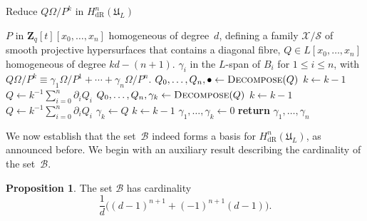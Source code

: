 \documentclass[a4paper,11pt]{article}
\numberwithin{equation}{section}
\newcommand{\ZZ}{\mathbf{Z}} %
\providecommand{\HdR}{H_{\text{dR}}}    %
\providecommand{\cB}{\mathcal{B}} %
\theoremstyle{definition}
\newtheorem{prop}[thm]{Proposition}
\begin{document}
\begin{algorithm}
\caption{Reduce $Q \Omega / P^k$ in $\HdR^n(\mathfrak{U}_L)$}
\label{alg:PoleRed}
\begin{algorithmic}
\vspace{1mm}
\Require $P$ in $\ZZ_q[t][x_0, \dotsc, x_n]$ homogeneous of degree~$d$, 
         defining a family $\mathcal{X}/\mathcal{S}$ of smooth projective 
         hypersurfaces that contains a diagonal fibre, $Q \in L[x_0, \dotsc, x_n]$ 
         homogeneous of degree $kd - (n+1)$.
\Ensure  $\gamma_i$ in the $L$-span of $B_i$ for $1 \leq i \leq n$, with  
         $Q \Omega / P^k \equiv \gamma_{1} \Omega / P^{1} + \dotsb + \gamma_n \Omega / P^n$.
\State $Q_0, \dotsc, Q_n, \bullet \gets \Call{Decompose}{Q}$
\State $k \gets k-1$
\State $Q \gets k^{-1} \sum_{i=0}^n \partial_i Q_i$
\EndWhile
{}
\State $Q_0, \dotsc, Q_n, \gamma_k \gets \Call{Decompose}{Q}$
\State $k \gets k-1$
\State $Q \gets k^{-1} \sum_{i=0}^n \partial_i Q_i$
\EndWhile
{}
\State $\gamma_{k} \gets Q$
\State $k \gets k-1$
\EndIf
\State $\gamma_{1}, \dotsc, \gamma_{k} \gets 0$
\State \textbf{return} $\gamma_{1}, \dotsc, \gamma_n$
\EndProcedure
\end{algorithmic}
\end{algorithm}

We now establish that the set~$\cB$ indeed forms a basis for 
$\HdR^n(\mathfrak{U}_L)$, as announced before.  We begin with an 
auxiliary result describing the cardinality of the set~$\cB$.

\begin{prop} \label{prop:BasisSize}
The set $\cB$ has cardinality
\begin{equation*}
\frac{1}{d} \bigl((d-1)^{n+1} + (-1)^{n+1}(d-1) \bigr).
\end{equation*}
\end{prop}
\end{document}
